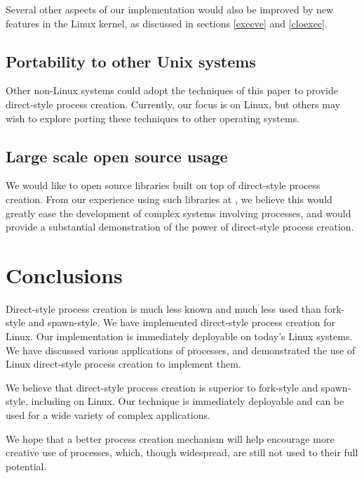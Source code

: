 \documentclass[letterpaper,twocolumn,10pt]{article}
\begin{document}
Several other aspects of our implementation would also be improved by new features in the Linux kernel,
as discussed in sections \ref{execve} and \ref{cloexec}.
\subsection{Portability to other Unix systems}
Other non-Linux systems
could adopt the techniques of this paper
to provide direct-style process creation.
Currently, our focus is on Linux,
but others may wish to explore porting these techniques to other operating systems.
\subsection{Large scale open source usage}
We would like to open source libraries built on top of direct-style process creation.
From our experience using such libraries at \twosigma,
we believe this would greatly ease the development of complex systems involving processes,
and would provide a substantial demonstration of the power of direct-style process creation.
\section{Conclusions}\label{conclusions}
Direct-style process creation is much less known and much less used than fork-style and spawn-style.
We have implemented direct-style process creation for Linux.
Our implementation is immediately deployable on today's Linux systems.
We have discussed various applications of processes,
and demonstrated the use of Linux direct-style process creation
to implement them.

We believe that direct-style process creation is superior to fork-style and spawn-style,
including on Linux.
Our technique is immediately deployable and can be used for a wide variety of complex applications.

We hope that a better process creation mechanism
will help encourage more creative use of processes,
which, though widespread,
are still not used to their full potential.



\end{document}
